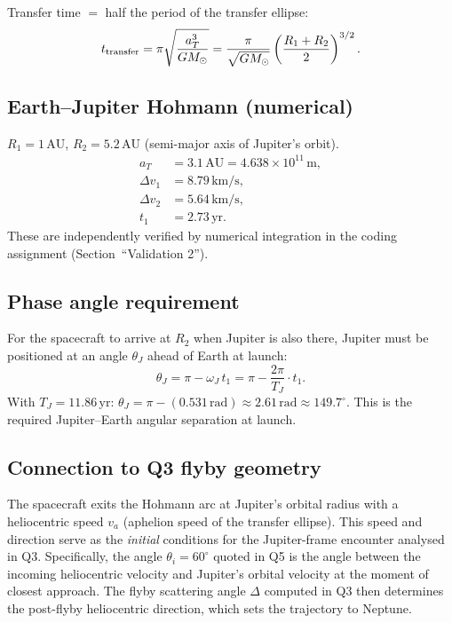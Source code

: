 \documentclass[11pt, a4paper]{article}
\newcommand{\unit}[1]{\,\mathrm{#1}}
\begin{document}
Transfer time $= $ half the period of the transfer ellipse:
\begin{equation}
  t_{\rm transfer} = \pi\sqrt{\frac{a_T^3}{GM_\odot}}
                   = \frac{\pi}{\sqrt{GM_\odot}}\left(\frac{R_1+R_2}{2}\right)^{3/2}.
\end{equation}

\subsection*{Earth–Jupiter Hohmann (numerical)}

$R_1 = 1\unit{AU}$, $R_2 = 5.2\unit{AU}$ (semi-major axis of Jupiter's orbit).
\begin{align*}
  a_T      &= 3.1\unit{AU} = 4.638\times10^{11}\unit{m},\\
  \Delta v_1 &= 8.79\unit{km/s},\\
  \Delta v_2 &= 5.64\unit{km/s},\\
  t_1      &= 2.73\unit{yr}.
\end{align*}
These are independently verified by numerical integration in the coding assignment
(Section~``Validation 2'').

\subsection*{Phase angle requirement}

For the spacecraft to arrive at $R_2$ when Jupiter is also there, Jupiter must be
positioned at an angle $\theta_J$ ahead of Earth at launch:
\[
  \theta_J = \pi - \omega_J\,t_1
           = \pi - \frac{2\pi}{T_J}\cdot t_1.
\]
With $T_J = 11.86\unit{yr}$: $\theta_J = \pi - (0.531\unit{rad}) \approx 2.61\unit{rad}
\approx 149.7^\circ$.  This is the required Jupiter–Earth angular separation at launch.

\subsection*{Connection to Q3 flyby geometry}

The spacecraft exits the Hohmann arc at Jupiter's orbital radius with a heliocentric
speed $v_a$ (aphelion speed of the transfer ellipse).  This speed and direction serve
as the \emph{initial} conditions for the Jupiter-frame encounter analysed in Q3.
Specifically, the angle $\theta_i = 60^\circ$ quoted in Q5 is the angle between
the incoming heliocentric velocity and Jupiter's orbital velocity at the moment of
closest approach.  The flyby scattering angle $\Delta$ computed in Q3 then determines
the post-flyby heliocentric direction, which sets the trajectory to Neptune.
\end{document}
